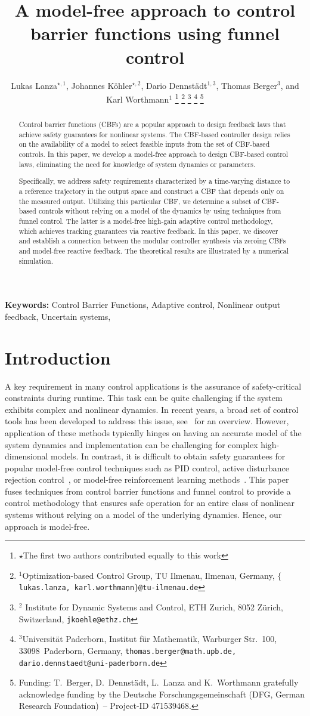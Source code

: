 \documentclass[journal,twoside,web]{ieeeconf}
\title{\LARGE \bf
A model-free approach to control barrier functions using funnel control
}
\author{Lukas Lanza$^{\star,1}$, Johannes Köhler$^{\star,2}$, Dario Dennstädt$^{1,3}$, Thomas Berger$^{3}$, and Karl Worthmann$^{1}$%
\thanks{$\star$The first two authors contributed equally to this work}
\thanks{$^{1}$Optimization-based Control Group, TU Ilmenau, Ilmenau, Germany, {\tt\small $\{$lukas.lanza, karl.worthmann$\}$@tu-ilmenau.de}}%
\thanks{$^{2}$ Institute for Dynamic Systems and Control, ETH Zurich, 8052 Zürich, Switzerland,
         {\tt\small jkoehle@ethz.ch}}%
\thanks{$^{3}$Universit\"at Paderborn, Institut f\"ur Mathematik, Warburger Str.~100, 33098~Paderborn, Germany,  {\tt\small thomas.berger@math.upb.de,  dario.dennstaedt@uni-paderborn.de}}%
\thanks{Funding: T.~Berger, D.~Dennstädt, L.~Lanza and K.~Worthmann gratefully acknowledge funding by the Deutsche Forschungsgemeinschaft (DFG, German Research Foundation)~-- Project-ID 471539468.}%
}
\begin{document}
\maketitle


\begin{abstract}
Control barrier functions (CBFs) are a popular approach to design feedback laws that achieve safety guarantees for nonlinear systems.
The CBF-based controller design relies on the availability of a model to select feasible inputs from the set of CBF-based controls. 
In this paper, we develop a model-free approach to design CBF-based control laws, eliminating the need for knowledge of system dynamics or parameters.

Specifically, we address safety requirements characterized by a time-varying distance to a reference trajectory in the output space and construct a CBF that depends only on the measured output.
Utilizing this particular CBF, we determine a subset of CBF-based controls without relying on a model of the dynamics by using techniques from funnel control. 
The latter is a model-free high-gain adaptive control methodology, which achieves tracking guarantees via reactive feedback.
In this paper, we discover and establish a connection between the modular controller synthesis via zeroing CBFs and model-free reactive feedback.
The theoretical results are illustrated by a numerical simulation.
\end{abstract}

\textbf{Keywords:} 
Control Barrier Functions, Adaptive control, Nonlinear output feedback, Uncertain systems, 

\section{Introduction} \label{Sec:Introduction}
A key requirement in many control applications is the assurance of safety-critical constraints during runtime. 
This task can be quite challenging if the system exhibits complex and nonlinear dynamics. 
In recent years, a broad set of control tools has been developed to address this issue, see~\cite{wabersich2023data} for an overview. 
However, application of these methods typically hinges on having an accurate model of the system dynamics and implementation can be challenging for complex high-dimensional models. 
In contrast, it is difficult to obtain safety guarantees for popular
model-free control techniques such as PID control, active disturbance rejection control~\cite{han2009pid}, or model-free reinforcement learning methods~\cite{brunke2022safe}.
This paper fuses techniques from control barrier functions and funnel control to provide a control methodology that ensures safe operation for an entire class of nonlinear systems without relying on a model of the underlying dynamics. Hence, our approach is model-free.
\end{document}
